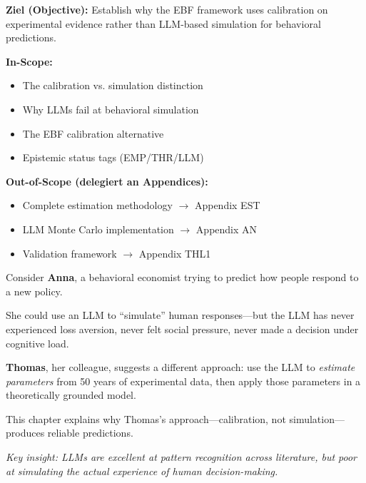 \begin{tcolorbox}[
    colback=purple!5!white,
    colframe=purple!75!black,
    title={\textbf{Chapter Scope: Ziel / In-Scope / Out-of-Scope}},
    fonttitle=\bfseries
]

\textbf{Ziel (Objective):}
Establish why the EBF framework uses calibration on experimental evidence rather than LLM-based simulation for behavioral predictions.

\vspace{0.3cm}
\textbf{In-Scope:}
\begin{itemize}[nosep]
    \item The calibration vs. simulation distinction
    \item Why LLMs fail at behavioral simulation
    \item The EBF calibration alternative
    \item Epistemic status tags (EMP/THR/LLM)
\end{itemize}

\vspace{0.3cm}
\textbf{Out-of-Scope (delegiert an Appendices):}
\begin{itemize}[nosep]
    \item Complete estimation methodology $\rightarrow$ Appendix EST
    \item LLM Monte Carlo implementation $\rightarrow$ Appendix AN
    \item Validation framework $\rightarrow$ Appendix THL1
\end{itemize}

\end{tcolorbox}

\begin{tcolorbox}[
    colback=blue!5!white,
    colframe=blue!75!black,
    title={\textbf{Intuition: Why Calibration Beats Simulation}},
    fonttitle=\bfseries
]
Consider \textbf{Anna}, a behavioral economist trying to predict how people respond to a new policy.

She could use an LLM to ``simulate'' human responses---but the LLM has never experienced loss aversion, never felt social pressure, never made a decision under cognitive load.

\textbf{Thomas}, her colleague, suggests a different approach: use the LLM to \emph{estimate parameters} from 50 years of experimental data, then apply those parameters in a theoretically grounded model.

This chapter explains why Thomas's approach---calibration, not simulation---produces reliable predictions.

\medskip
\textit{Key insight: LLMs are excellent at pattern recognition across literature, but poor at simulating the actual experience of human decision-making.}
\end{tcolorbox}


